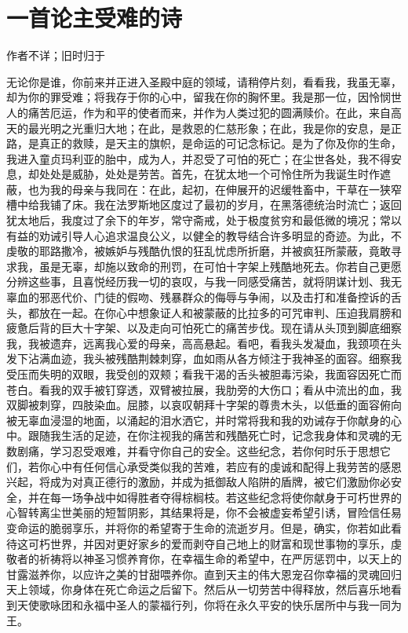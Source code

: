 
\chapter{一首论主受难的诗}


作者不详；旧时归于\par

无论你是谁，你前来并正进入圣殿中庭的领域，请稍停片刻，看看我，我虽无辜，却为你的罪受难；将我存于你的心中，留我在你的胸怀里。我是那一位，因怜悯世人的痛苦厄运，作为和平的使者而来，并作为人类过犯的圆满赎价。在此，来自高天的最光明之光重归大地；在此，是救恩的仁慈形象；在此，我是你的安息，是正路，是真正的救赎，是天主的旗帜，是命运的可记念标记。是为了你及你的生命，我进入童贞玛利亚的胎中，成为人，并忍受了可怕的死亡；在尘世各处，我不得安息，却处处是威胁，处处是劳苦。首先，在犹太地一个可怜住所为我诞生时作遮蔽，也为我的母亲与我同在：在此，起初，在伸展开的迟缓牲畜中，干草在一狭窄槽中给我铺了床。我在法罗斯地区度过了最初的岁月，在黑落德统治时流亡；返回犹太地后，我度过了余下的年岁，常守斋戒，处于极度贫穷和最低微的境况；常以有益的劝诫引导人心追求温良公义，以健全的教导结合许多明显的奇迹。为此，不虔敬的耶路撒冷，被嫉妒与残酷仇恨的狂乱忧虑所折磨，并被疯狂所蒙蔽，竟敢寻求我，虽是无辜，却施以致命的刑罚，在可怕十字架上残酷地死去。你若自己更愿分辨这些事，且喜悦经历我一切的哀叹，与我一同感受痛苦，就将阴谋计划、我无辜血的邪恶代价、门徒的假吻、残暴群众的侮辱与争闹，以及击打和准备控诉的舌头，都放在一起。在你心中想象证人和被蒙蔽的比拉多的可咒审判、压迫我肩膀和疲惫后背的巨大十字架、以及走向可怕死亡的痛苦步伐。现在请从头顶到脚底细察我，我被遗弃，远离我心爱的母亲，高高悬起。看吧，看我头发凝血，我颈项在头发下沾满血迹，我头被残酷荆棘刺穿，血如雨从各方倾注于我神圣的面容。细察我受压而失明的双眼，我受创的双颊；看我干渴的舌头被胆毒污染，我面容因死亡而苍白。看我的双手被钉穿透，双臂被拉展，我肋旁的大伤口；看从中流出的血，我双脚被刺穿，四肢染血。屈膝，以哀叹朝拜十字架的尊贵木头，以低垂的面容俯向被无辜血浸湿的地面，以涌起的泪水洒它，并时常将我和我的劝诫存于你献身的心中。跟随我生活的足迹，在你注视我的痛苦和残酷死亡时，记念我身体和灵魂的无数剧痛，学习忍受艰难，并看守你自己的安全。这些纪念，若你何时乐于思想它们，若你心中有任何信心承受类似我的苦难，若应有的虔诚和配得上我劳苦的感恩兴起，将成为对真正德行的激励，并成为抵御敌人陷阱的盾牌，被它们激励你必安全，并在每一场争战中如得胜者夺得棕榈枝。若这些纪念将使你献身于可朽世界的心智转离尘世美丽的短暂阴影，其结果将是，你不会被虚妄希望引诱，冒险信任易变命运的脆弱享乐，并将你的希望寄于生命的流逝岁月。但是，确实，你若如此看待这可朽世界，并因对更好家乡的爱而剥夺自己地上的财富和现世事物的享乐，虔敬者的祈祷将以神圣习惯养育你，在幸福生命的希望中，在严厉惩罚中，以天上的甘露滋养你，以应许之美的甘甜喂养你。直到天主的伟大恩宠召你幸福的灵魂回归天上领域，你身体在死亡命运之后留下。然后从一切劳苦中得释放，然后喜乐地看到天使歌咏团和永福中圣人的蒙福行列，你将在永久平安的快乐居所中与我一同为王。\par

